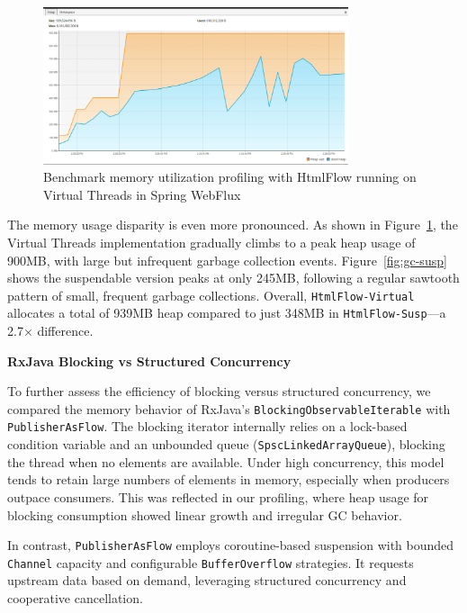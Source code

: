 \begin{figure}[h]
     \centering
     \includegraphics[width=0.8\textwidth]{./Graphs/gc-virt.png}
     \caption{Benchmark memory utilization profiling with HtmlFlow running on Virtual Threads in Spring WebFlux}\label{fig:gc-virt}
\end{figure}

The memory usage disparity is even more pronounced. As shown in
Figure~\ref{fig:gc-virt}, the Virtual Threads implementation gradually climbs
to a peak heap usage of 900MB, with large but infrequent garbage collection
events. Figure~\ref{fig:gc-susp} shows the suspendable version peaks at only
245MB, following a regular sawtooth pattern of small, frequent garbage
collections. Overall, \texttt{HtmlFlow-Virtual} allocates a total of 939MB heap
compared to just 348MB in \texttt{HtmlFlow-Susp}—a 2.7× difference.

\textbf{RxJava Blocking vs Structured Concurrency}

To further assess the efficiency of blocking versus structured concurrency, we
compared the memory behavior of RxJava's \texttt{BlockingObservableIterable}
with \texttt{PublisherAsFlow}. The blocking iterator internally relies on a
lock-based condition variable and an unbounded queue
(\texttt{SpscLinkedArrayQueue}), blocking the thread when no elements are
available. Under high concurrency, this model tends to retain large numbers of
elements in memory, especially when producers outpace consumers. This was
reflected in our profiling, where heap usage for blocking consumption showed
linear growth and irregular GC behavior.

In contrast, \texttt{PublisherAsFlow} employs coroutine-based suspension with
bounded \texttt{Channel} capacity and configurable \texttt{BufferOverflow}
strategies. It requests upstream data based on demand, leveraging structured
concurrency and cooperative cancellation.

